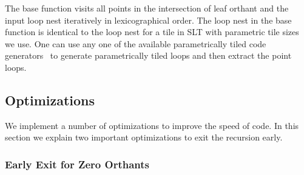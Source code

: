 The base function visits all points in the intersection of leaf orthant and
the input loop nest iteratively in lexicographical order.  The loop nest in
the base function is identical to the loop nest for a tile in SLT with
parametric tile sizes we use.  One can use any one of the available
parametrically tiled code generators~\cite{sanjay-lcpc2009,
  sanjay-kim-dtilingTR-2010,baskaran-etal-cgo10,iooss:hal2015} to generate
parametrically tiled loops and then extract the point loops.


\subsection{Optimizations}
\label{sec:codegen:opt}
We implement a number of optimizations to improve the speed of code.  In this
section we explain two important optimizations to exit the recursion early.

\subsubsection{Early Exit for Zero Orthants}

